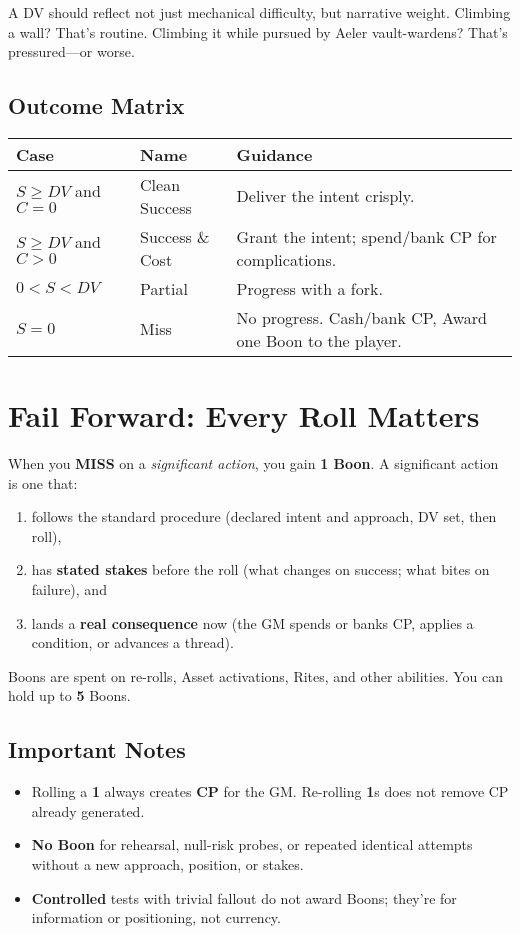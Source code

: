 A DV should reflect not just mechanical difficulty, but narrative weight. Climbing a wall? That's routine. Climbing it while pursued by Aeler vault-wardens? That's pressured---or worse.

\subsection{Outcome Matrix}

\begin{center}
\begin{tabular}{lll}
\toprule
\textbf{Case} & \textbf{Name} & \textbf{Guidance} \\
\midrule
$S \geq DV$ and $C = 0$ & Clean Success\index{Clean Success} & Deliver the intent crisply. \\
$S \geq DV$ and $C > 0$ & Success \& Cost\index{Success \& Cost} & Grant the intent; spend/bank CP for complications. \\
$0 < S < DV$ & Partial\index{Partial} & Progress with a fork. \\
$S = 0$ & Miss\index{Miss} & No progress. Cash/bank CP, Award one Boon\index{Boon!acquiring} to the player. \\
\bottomrule
\end{tabular}
\end{center}

\section{Fail Forward: Every Roll Matters}

When you \textbf{MISS} on a \emph{significant action}, you gain \textbf{1 Boon}. A significant action is one that:
\begin{enumerate}
  \item follows the standard procedure (declared intent and approach, DV set, then roll), 
  \item has \textbf{stated stakes} before the roll (what changes on success; what bites on failure), and
  \item lands a \textbf{real consequence} now (the GM spends or banks CP, applies a condition, or advances a thread).
\end{enumerate}
 
\noindent Boons are spent on re-rolls, Asset activations, Rites, and other abilities. You can hold up to \textbf{5} Boons.

\subsection{Important Notes}
\begin{itemize}
  \item Rolling a \textbf{1} always creates \textbf{CP} for the GM. Re-rolling \textbf{1}s does not remove CP already generated.
  \item \textbf{No Boon} for rehearsal, null-risk probes, or repeated identical attempts without a new approach, position, or stakes.
  \item \textbf{Controlled} tests with trivial fallout do not award Boons; they're for information or positioning, not currency.
\end{itemize}

